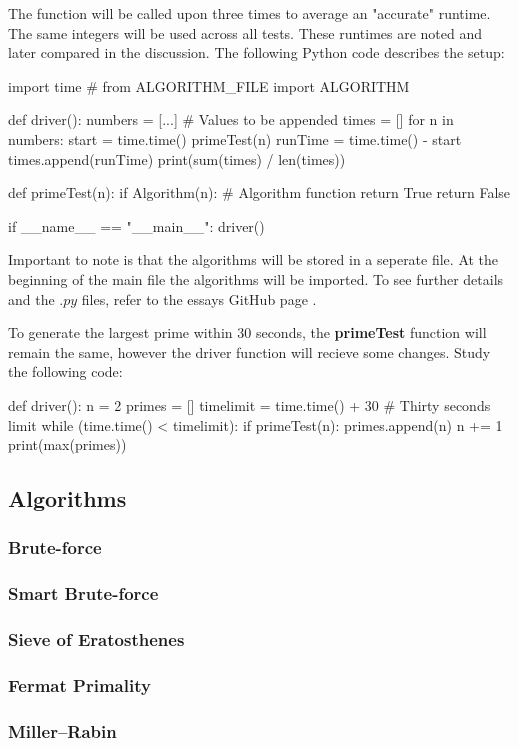 \documentclass[main.tex]{subfiles}
\begin{document}
\vspace{10mm}

The function will be called upon three times to average an "accurate" runtime. The same integers will be used across all tests. These runtimes are noted and later compared in the discussion. The following Python code describes the setup:

\begin{python}
    import time
    # from ALGORITHM_FILE import ALGORITHM

    def driver():
        numbers = [...] # Values to be appended
        times = []
        for n in numbers:
            start = time.time()
            primeTest(n)
            runTime = time.time() - start
            times.append(runTime)
        print(sum(times) / len(times))

    def primeTest(n):
        if Algorithm(n): # Algorithm function
            return True
        return False

    if __name__ == "__main__":
        driver()
\end{python}

Important to note is that the algorithms will be stored in a seperate file. At the beginning of the main file the algorithms will be imported. To see further details and the $.py$ files, refer to the essays GitHub page \cite{github}.

\vspace{10mm}

To generate the largest prime within 30 seconds, the \textbf{primeTest} function will remain the same, however the driver function will recieve some changes. Study the following code:

\begin{python}
    def driver():
        n = 2
        primes = []
        timelimit = time.time() + 30  # Thirty seconds limit
        while (time.time() < timelimit):
            if primeTest(n):
                primes.append(n)
            n += 1
        print(max(primes))
\end{python}

\subsection{Algorithms}

\subsubsection{Brute-force}

\subsubsection{Smart Brute-force}

\subsubsection{Sieve of Eratosthenes}

\subsubsection{Fermat Primality}

\subsubsection{Miller–Rabin}
\end{document}

